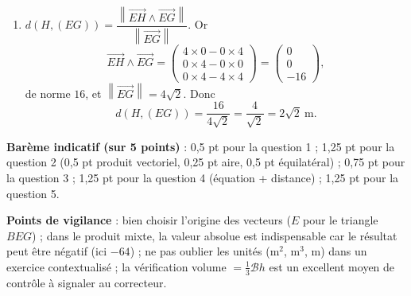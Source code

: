 \documentclass[11pt]{article}
\begin{document}
\begin{corrige}
\begin{enumerate}
\item $d(H, (EG)) = \dfrac{\left\|\overrightarrow{EH} \wedge \overrightarrow{EG}\right\|}{\left\|\overrightarrow{EG}\right\|}$. Or
\[ \overrightarrow{EH} \wedge \overrightarrow{EG} = \begin{pmatrix} 4\times 0 - 0\times 4 \\ 0\times 4 - 0\times 0 \\ 0\times 4 - 4\times 4 \end{pmatrix} = \begin{pmatrix} 0 \\ 0 \\ -16 \end{pmatrix}, \]
de norme $16$, et $\left\|\overrightarrow{EG}\right\| = 4\sqrt{2}$. Donc
\[ d(H, (EG)) = \dfrac{16}{4\sqrt{2}} = \dfrac{4}{\sqrt{2}} = 2\sqrt{2} \ \mathrm{m}. \]
\end{enumerate}
\textbf{Barème indicatif (sur 5 points)} : 0,5 pt pour la question 1 ; 1,25 pt pour la question 2 (0,5 pt produit vectoriel, 0,25 pt aire, 0,5 pt équilatéral) ; 0,75 pt pour la question 3 ; 1,25 pt pour la question 4 (équation + distance) ; 1,25 pt pour la question 5.

\textbf{Points de vigilance} : bien choisir l'origine des vecteurs ($E$ pour le triangle $BEG$) ; dans le produit mixte, la valeur absolue est indispensable car le résultat peut être négatif (ici $-64$) ; ne pas oublier les unités ($\mathrm{m}^2$, $\mathrm{m}^3$, $\mathrm{m}$) dans un exercice contextualisé ; la vérification volume $= \frac{1}{3}\mathcal{B}h$ est un excellent moyen de contrôle à signaler au correcteur.
\end{corrige}
\end{document}
